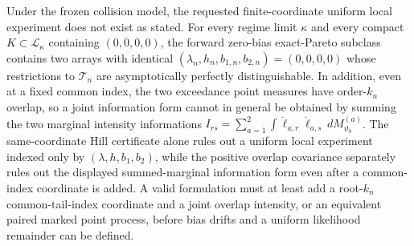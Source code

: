 Under the frozen collision model, the requested finite-coordinate uniform local experiment does not exist as stated.  For every regime limit \(\kappa\) and every compact \(K\subset\mathcal L_\kappa\) containing \((0,0,0,0)\), the forward zero-bias exact-Pareto subclass contains two arrays with identical \((\lambda_n,h_n,b_{1,n},b_{2,n})=(0,0,0,0)\) whose restrictions to \(\mathcal T_n\) are asymptotically perfectly distinguishable.  In addition, even at a fixed common index, the two exceedance point measures have order-\(k_n\) overlap, so a joint information form cannot in general be obtained by summing the two marginal intensity informations \(I_{rs}=\sum_{a=1}^2\int\dot\ell_{a,r}\dot\ell_{a,s}\,dM_{\vartheta_0}^{(a)}\).  The same-coordinate Hill certificate alone rules out a uniform local experiment indexed only by \((\lambda,h,b_1,b_2)\), while the positive overlap covariance separately rules out the displayed summed-marginal information form even after a common-index coordinate is added.  A valid formulation must at least add a root-\(k_n\) common-tail-index coordinate and a joint overlap intensity, or an equivalent paired marked point process, before bias drifts and a uniform likelihood remainder can be defined.